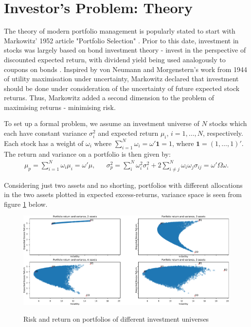 \documentclass[11pt,a4paper,oneside]{article}
\newcommand{\lp}{\left(}
\newcommand{\rp}{\right)}
\begin{document}
\rfoot{\thepage}

\setcounter{page}{1}

\section{Investor's Problem: Theory}
The theory of modern portfolio management is popularly stated to start with Markowitz' 1952 article "Portfolio Selection" \cite{MPT52}. Prior to this date, investment in stocks was largely based on bond investment theory - invest in the perspective of discounted expected return, with dividend yield being used analogously to coupons on bonds \cite{guerard2016}. Inspired by von Neumann and Morgenstern's work from 1944 \cite{vnm1944} of utility maximisation under uncertainty, Markowitz declared that investment should be done under consideration of the uncertainty of future expected stock returns. Thus, Markowitz added a second dimension to the problem of maximising returns - minimising risk.

To set up a formal problem, we assume an investment universe of $N$ stocks which each have constant variance $\sigma_i^2$ and expected return $\mu_i$, $i = 1, \dots, N$, respectively. Each stock has a weight of $\omega_i$ where $\sum_{i = 1}^N \omega_i = \omega'\mathbf{1} = 1$, where $\mathbf{1} = \lp 1, \dots, 1\rp'$. The return and variance on a portfolio is then given by:
\begin{align*}
    \mu_p = \sum_{i=1}^N \omega_i \mu_i = \omega'\mu, &&
    \sigma_p^2 = \sum_{i}^N \omega_i^2 \sigma_i^2 + 2 \sum_{i\neq j}^N \omega_i\omega_j \sigma_{ij} = \omega'\Omega \omega.
\end{align*}

Considering just two assets and no shorting, portfolios with different allocations in the two assets plotted in expected excess-returns, variance space is seen from figure \ref{plot:pfAllocExample} below.

\begin{figure}[ht]
\centering
\vspace{4mm}
\caption{Risk and return on portfolios of different investment universes}
\label{plot:pfAllocExample}
\includegraphics[scale=0.55]{images/pfAllocations.pdf}
\begingroup
\vspace{4mm}
\endgroup
\end{figure}
\end{document}
